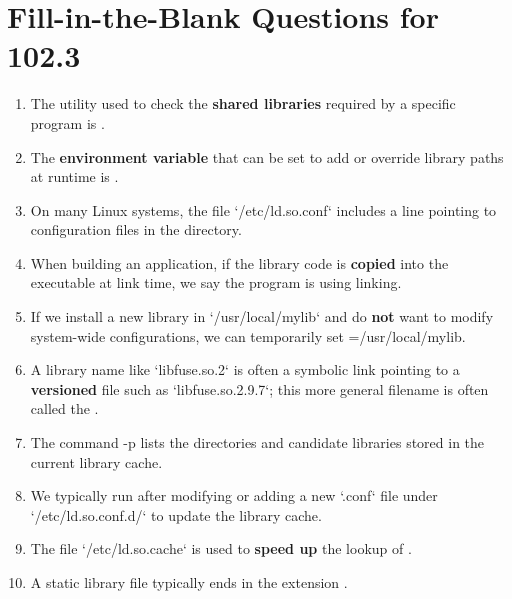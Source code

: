 \documentclass[a4paper]{report}
\begin{document}
\newpage
\section*{Fill-in-the-Blank Questions for 102.3}

\begin{enumerate}[1.]

\item The utility used to check the \textbf{shared libraries} required by a specific program is \underline{\hspace{2cm}}.

\item The \textbf{environment variable} that can be set to add or override library paths at runtime is \underline{\hspace{2cm}}.

\item On many Linux systems, the file `/etc/ld.so.conf` includes a line pointing to configuration files in the \underline{\hspace{2cm}} directory.

\item When building an application, if the library code is \textbf{copied} into the executable at link time, we say the program is using \underline{\hspace{2cm}} linking.

\item If we install a new library in `/usr/local/mylib` and do \textbf{not} want to modify system-wide configurations, we can temporarily set \underline{\hspace{2cm}}=/usr/local/mylib.

\item A library name like `libfuse.so.2` is often a symbolic link pointing to a \textbf{versioned} file such as `libfuse.so.2.9.7`; this more general filename is often called the \underline{\hspace{2cm}}.

\item The command \underline{\hspace{2cm}} -p lists the directories and candidate libraries stored in the current library cache.

\item We typically run \underline{\hspace{2cm}} after modifying or adding a new `.conf` file under `/etc/ld.so.conf.d/` to update the library cache.

\item The file `/etc/ld.so.cache` is used to \textbf{speed up} the lookup of \underline{\hspace{2cm}}.

\item A static library file typically ends in the extension \underline{\hspace{2cm}}.

\end{enumerate}
\end{document}
